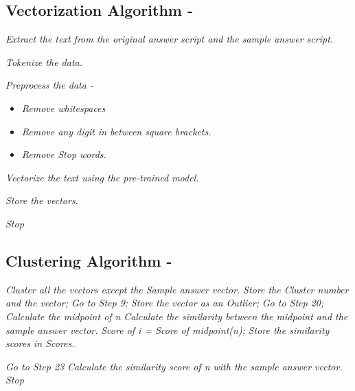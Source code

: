 \subsection{Vectorization Algorithm -}
    \begin{algorithmic}[1]
        \item \textit{Extract the text from the original answer script and the sample answer script.}
        \item \textit{Tokenize the data.}
        \item \textit{Preprocess the data -}
        \begin{itemize}
            \item \textit{Remove whitespaces}
            \item \textit{Remove any digit in between square brackets.}
            \item \textit{Remove Stop words.}
        \end{itemize}
        \item \textit{Vectorize the text using the pre-trained model.}
        \item \textit{Store the vectors.}
        \item \textit{Stop}
    \end{algorithmic}
    
\subsection{Clustering Algorithm -}
\begin{algorithmic}[1]
    \State \textit{Cluster all the vectors except the Sample answer vector.}
        \State \textit{Store the Cluster number and the vector;}
        \State \textit{Go to Step 9;}
    \Else
        \State \textit{Store the vector as an Outlier;}
        \State \textit{Go to Step 20;}
    \EndIf
        \State \textit{Calculate the midpoint of n}
        \State \textit{Calculate the similarity between the midpoint and the sample answer vector.}
    \EndFor
            \State \textit{Score of i = Score of midpoint(n);}
            \State \textit{Store the similarity scores in Scores.}
        \EndFor
    
    \EndFor
    \State \textit{Go to Step 23}  %
        \State \textit{Calculate the similarity score of n with the sample answer vector.}
    \EndFor
    \State \textit{Stop}

\end{algorithmic}

